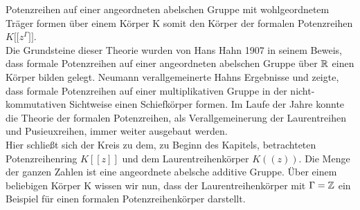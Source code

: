Potenzreihen auf einer angeordneten abelschen Gruppe mit wohlgeordnetem Träger formen über einem Körper K somit den Körper der formalen Potenzreihen $K\lbrack\lbrack z^\Gamma\rbrack\rbrack$. \\
Die Grundsteine dieser Theorie wurden von Hans Hahn 1907 in seinem Beweis, dass formale Potenzreihen auf einer angeordneten abelschen Gruppe über $\mathbb{R}$ einen Körper bilden gelegt. Neumann verallgemeinerte Hahns Ergebnisse und zeigte, dass formale Potenzreihen auf einer multiplikativen Gruppe in der nicht-kommutativen Sichtweise einen Schiefkörper formen. Im Laufe der Jahre konnte die Theorie der formalen Potenzreihen, als Verallgemeinerung der Laurentreihen und Pusieuxreihen, immer weiter ausgebaut werden. \\
Hier schließt sich der Kreis zu dem, zu Beginn des Kapitels, betrachteten Potenzreihenring $K[[z]]$ und dem Laurentreihenkörper $K((z))$. Die Menge der ganzen Zahlen ist eine angeordnete abelsche additive Gruppe. Über einem beliebigen Körper K wissen wir nun, dass der Laurentreihenkörper mit $\Gamma = \mathbb{Z}$ ein Beispiel für einen formalen Potenzreihenkörper darstellt.
